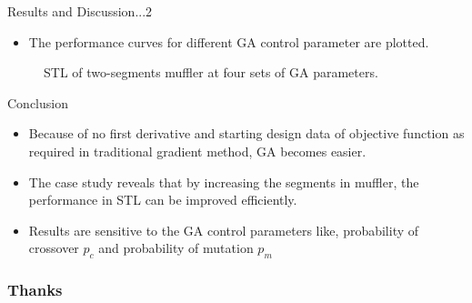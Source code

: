 \documentclass{beamer}
\begin{document}
\begin{frame}{Results and Discussion...2}
\begin{itemize}
\item The performance curves for different GA control parameter are plotted.
\end{itemize}
\begin{figure}

\caption{\label{fig:your-figure14} STL of two-segments muffler at four sets of GA parameters.}
\end{figure}
\end{frame}
\begin{frame}{Conclusion}
\begin{itemize}
\item Because of no first derivative and starting design data of objective function as required in traditional gradient method, GA becomes easier.
\item The case study reveals that by increasing the segments in muffler, the performance in STL can be improved efficiently.
\item Results are sensitive to the GA control parameters like, probability of crossover $p_{c}$ and probability of mutation $p_{m}$
\end{itemize}
\end{frame}
\begin{frame}
\frametitle{Thanks}
\begin{center}


\end{center}
\end{frame}

\end{document}
